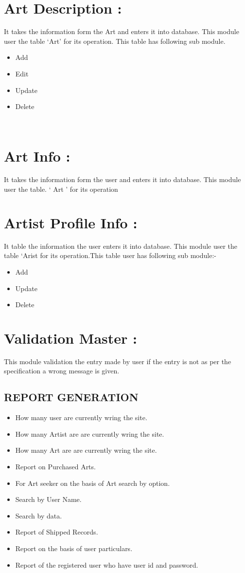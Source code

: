 \documentclass{article}
\begin{document}
\section*{Art Description : }
It takes the information form the Art and enters it into database. This module user the table ‘Art’ for its operation.
This table has following sub module.
\begin{itemize}
    \item Add
\item Edit
\item Update
\item Delete
\end{itemize}
\\
\section*{Art Info : }
It takes the information form the user and enters it into database. This module user the table. ‘ Art ’ for its operation
\section*{Artist Profile Info : }
It table the information the user enters it into database. This module user the table ‘Arist for its operation.This table user has following sub module:-
\begin{itemize}
    \item Add
\item Update
\item Delete
\end{itemize}
\section*{Validation Master : }
This module validation the entry made by user if the entry is not as per the specification a wrong message is given.
\begin{center}
   \section*{\textbf{REPORT GENERATION}}
\end{center}
\begin{itemize}
    \item How many user are currently wring the site.
\item How many Artist are are currently wring the site.
\item How many Art are are currently wring the site.
\item Report on Purchased Arts.
\item For Art seeker on the basis of Art search by option.
\item Search by User Name.
\item Search by data.
\item Report of Shipped Records.
\item Report on the basis of user particulars.
\item Report of the registered user who have user id and password.
\end{itemize}
\\
\end{document}
